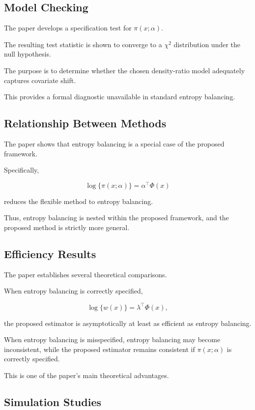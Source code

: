 \documentclass[11pt]{article}
\begin{document}
\subsection*{Model Checking}

The paper develops a specification test for $\pi(x;\alpha)$.

The resulting test statistic is shown to converge to a $\chi^2$ distribution under the null hypothesis.

The purpose is to determine whether the chosen density-ratio model adequately captures covariate shift.

This provides a formal diagnostic unavailable in standard entropy balancing.

\subsection*{Relationship Between Methods}

The paper shows that entropy balancing is a special case of the proposed framework.

Specifically,

\[\log\{\pi(x;\alpha)\}=\alpha^\top\Phi(x)\]

reduces the flexible method to entropy balancing.

Thus, entropy balancing is nested within the proposed framework, and the proposed method is strictly more general.

\subsection*{Efficiency Results}

The paper establishes several theoretical comparisons.

When entropy balancing is correctly specified,

\[\log\{w(x)\}=\lambda^\top\Phi(x),\]

the proposed estimator is asymptotically at least as efficient as entropy balancing.

When entropy balancing is misspecified, entropy balancing may become inconsistent, while the proposed estimator remains consistent if $\pi(x;\alpha)$ is correctly specified.

This is one of the paper's main theoretical advantages.

\subsection*{Simulation Studies}
\end{document}
